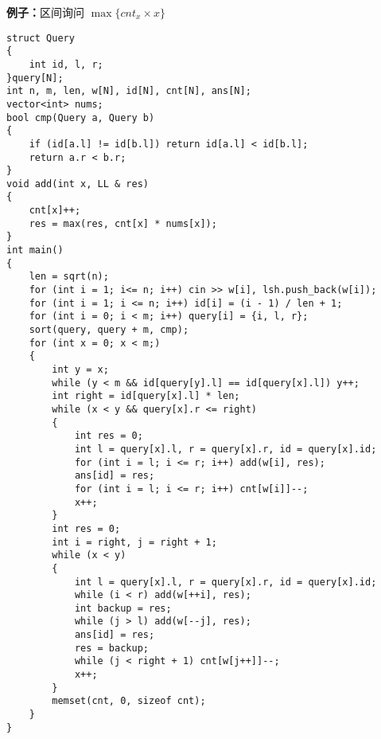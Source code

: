 \documentclass[a4paper, fontset=none]{ctexart}
\begin{document}
\textbf{例子：}区间询问 $\max\{cnt_x\times x\}$
\begin{verbatim}
struct Query
{
    int id, l, r;
}query[N];
int n, m, len, w[N], id[N], cnt[N], ans[N];
vector<int> nums;
bool cmp(Query a, Query b)
{
    if (id[a.l] != id[b.l]) return id[a.l] < id[b.l];
    return a.r < b.r;
}
void add(int x, LL & res)
{
    cnt[x]++;
    res = max(res, cnt[x] * nums[x]);
}
int main()
{
    len = sqrt(n);
    for (int i = 1; i<= n; i++) cin >> w[i], lsh.push_back(w[i]);
    for (int i = 1; i <= n; i++) id[i] = (i - 1) / len + 1;
    for (int i = 0; i < m; i++) query[i] = {i, l, r};
    sort(query, query + m, cmp);
    for (int x = 0; x < m;)
    {
        int y = x;
        while (y < m && id[query[y].l] == id[query[x].l]) y++;
        int right = id[query[x].l] * len;
        while (x < y && query[x].r <= right)
        {
            int res = 0;
            int l = query[x].l, r = query[x].r, id = query[x].id;
            for (int i = l; i <= r; i++) add(w[i], res);
            ans[id] = res;
            for (int i = l; i <= r; i++) cnt[w[i]]--;
            x++;
        }
        int res = 0;
        int i = right, j = right + 1;
        while (x < y)
        {
            int l = query[x].l, r = query[x].r, id = query[x].id;
            while (i < r) add(w[++i], res);
            int backup = res;
            while (j > l) add(w[--j], res);
            ans[id] = res;
            res = backup;
            while (j < right + 1) cnt[w[j++]]--;
            x++;
        }
        memset(cnt, 0, sizeof cnt);
    }
}
\end{verbatim}
\end{document}
